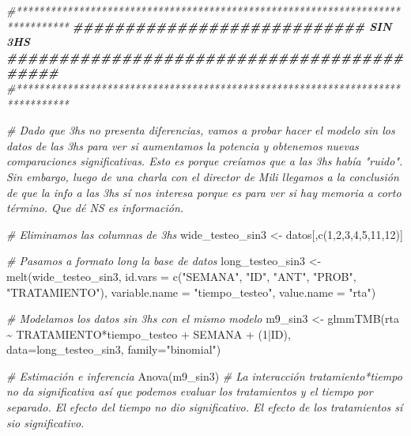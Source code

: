 \documentclass[
]{article}
\newenvironment{Shaded}{\begin{snugshade}}{\end{snugshade}}
\newcommand{\AttributeTok}[1]{\textcolor[rgb]{0.77,0.63,0.00}{#1}}
\newcommand{\CommentTok}[1]{\textcolor[rgb]{0.56,0.35,0.01}{\textit{#1}}}
\newcommand{\DecValTok}[1]{\textcolor[rgb]{0.00,0.00,0.81}{#1}}
\newcommand{\DocumentationTok}[1]{\textcolor[rgb]{0.56,0.35,0.01}{\textbf{\textit{#1}}}}
\newcommand{\FunctionTok}[1]{\textcolor[rgb]{0.00,0.00,0.00}{#1}}
\newcommand{\NormalTok}[1]{#1}
\newcommand{\OtherTok}[1]{\textcolor[rgb]{0.56,0.35,0.01}{#1}}
\newcommand{\SpecialCharTok}[1]{\textcolor[rgb]{0.00,0.00,0.00}{#1}}
\newcommand{\StringTok}[1]{\textcolor[rgb]{0.31,0.60,0.02}{#1}}
\begin{document}
\begin{Shaded}
\begin{Highlighting}[]
\CommentTok{\#*******************************************************************************}
\DocumentationTok{\#\#\#\#\#\#\#\#\#\#\#\#\#\#\#\#\#\#\#\#\#\#\#\#\#\#\#\# SIN 3HS \#\#\#\#\#\#\#\#\#\#\#\#\#\#\#\#\#\#\#\#\#\#\#\#\#\#\#\#\#\#\#\#\#\#\#\#\#\#\#\#\#\#\#}
\CommentTok{\#*******************************************************************************}

\CommentTok{\# Dado que 3hs no presenta diferencias, vamos a probar hacer el modelo sin los datos de las 3hs para ver si aumentamos la potencia y obtenemos nuevas comparaciones significativas. Esto es porque creíamos que a las 3hs había "ruido". Sin embargo, luego de una charla con el director de Mili llegamos a la conclusión de que la info a las 3hs sí nos interesa porque es para ver si hay memoria a corto término. Que dé NS es información.}

\CommentTok{\# Eliminamos las columnas de 3hs}
\NormalTok{wide\_testeo\_sin3 }\OtherTok{\textless{}{-}}\NormalTok{ datos[,}\FunctionTok{c}\NormalTok{(}\DecValTok{1}\NormalTok{,}\DecValTok{2}\NormalTok{,}\DecValTok{3}\NormalTok{,}\DecValTok{4}\NormalTok{,}\DecValTok{5}\NormalTok{,}\DecValTok{11}\NormalTok{,}\DecValTok{12}\NormalTok{)]}

\CommentTok{\# Pasamos a formato long la base de datos}
\NormalTok{long\_testeo\_sin3 }\OtherTok{\textless{}{-}} \FunctionTok{melt}\NormalTok{(wide\_testeo\_sin3,}
                  \AttributeTok{id.vars =} \FunctionTok{c}\NormalTok{(}\StringTok{"SEMANA"}\NormalTok{, }\StringTok{"ID"}\NormalTok{, }\StringTok{"ANT"}\NormalTok{, }\StringTok{"PROB"}\NormalTok{, }\StringTok{"TRATAMIENTO"}\NormalTok{),}
                  \AttributeTok{variable.name =} \StringTok{"tiempo\_testeo"}\NormalTok{,}
                  \AttributeTok{value.name =} \StringTok{"rta"}\NormalTok{)}

\CommentTok{\# Modelamos los datos sin 3hs con el mismo modelo}
\NormalTok{m9\_sin3 }\OtherTok{\textless{}{-}} \FunctionTok{glmmTMB}\NormalTok{(rta }\SpecialCharTok{\textasciitilde{}}\NormalTok{ TRATAMIENTO}\SpecialCharTok{*}\NormalTok{tiempo\_testeo }\SpecialCharTok{+}\NormalTok{ SEMANA }\SpecialCharTok{+}\NormalTok{ (}\DecValTok{1}\SpecialCharTok{|}\NormalTok{ID), }\AttributeTok{data=}\NormalTok{long\_testeo\_sin3, }\AttributeTok{family=}\StringTok{"binomial"}\NormalTok{)}

\CommentTok{\# Estimación e inferencia}
\FunctionTok{Anova}\NormalTok{(m9\_sin3) }\CommentTok{\# La interacción tratamiento*tiempo no da significativa así que podemos evaluar los tratamientos y el tiempo por separado. El efecto del tiempo no dio significativo. El efecto de los tratamientos sí sio significativo.}
\end{Highlighting}
\end{Shaded}
\end{document}
